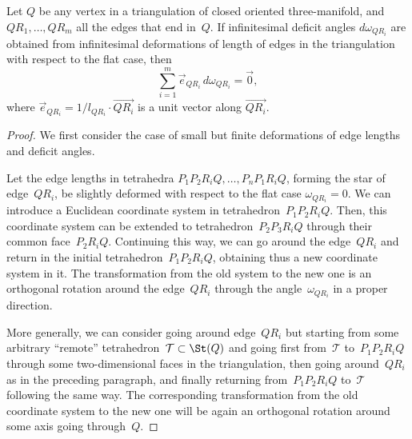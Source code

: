 \begin{lemma}
\label{lemma_infinitesimal}
Let $Q$ be any vertex in a triangulation of closed oriented three-manifold, and $QR_1,\ldots,\allowbreak QR_m$ all the edges that end in~$Q$. If infinitesimal deficit angles $d\omega_{QR_i}$ are obtained from infinitesimal deformations of length of edges in the triangulation with respect to the flat case, then{\samepage
\begin{equation}
\sum_{i=1}^m \vec e_{QR_i}\, d\omega_{QR_i} = \vec 0,
\label{eq_zero_for_dx*}
\end{equation}
where $\vec e_{QR_i}=1/l_{QR_i} \cdot \overrightarrow{QR_i}$ is a unit vector along $\overrightarrow{QR_i}$.}
\end{lemma}

\begin{proof}
We f\/irst consider the case of small but f\/inite deformations of edge lengths and def\/icit angles.

Let the edge lengths in tetrahedra $P_1P_2R_iQ, \ldots, P_nP_1R_iQ$, forming the star of edge~$QR_i$, be slightly deformed with respect to the f\/lat case $\omega_{QR_i}=0$. We can introduce a Euclidean coordinate system in tetrahedron~$P_1P_2R_iQ$. Then, this coordinate system can be extended to tetrahedron~$P_2P_3R_iQ$ through their common face~$P_2R_iQ$. Continuing this way, we can go around the edge~$QR_i$ and return in the initial tetrahedron~$P_1P_2R_iQ$, obtaining thus a new coordinate system in it. The transformation from the old system to the new one is an orthogonal rotation around the edge~$QR_i$ through the angle~$\omega_{QR_i}$ in a proper direction.

More generally, we can consider going around edge~$QR_i$ but starting from some arbitrary ``remote'' tetrahedron~$\mathcal T \subset \St(Q)$ and going f\/irst from~$\mathcal T$ to~$P_1P_2R_iQ$ through some two-dimen\-sion\-al faces in the triangulation, then going around~$QR_i$ as in the preceding paragraph, and f\/inally returning from~$P_1P_2R_iQ$ to~$\mathcal T$ following the same way. The corresponding transformation from the old coordinate system to the new one will be again an orthogonal rotation around some axis going through~$Q$.


\end{proof}
